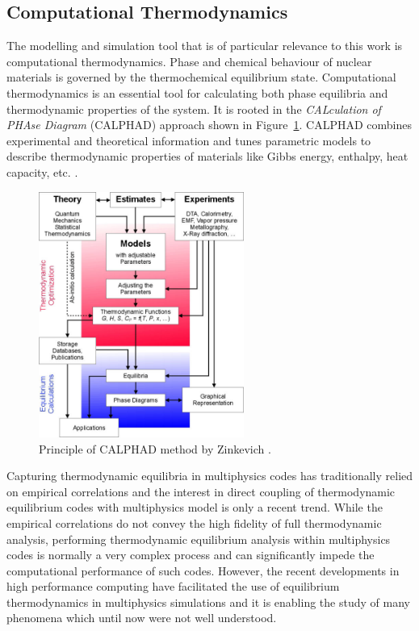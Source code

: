 \subsection{Computational Thermodynamics}
    The modelling and simulation tool that is of particular relevance to this work is computational thermodynamics. Phase and chemical behaviour of nuclear materials is governed by the thermochemical equilibrium state. Computational thermodynamics is an essential tool for calculating both phase equilibria and thermodynamic properties of the system. It is rooted in the \emph{CALculation of PHAse Diagram} (CALPHAD) approach shown in Figure~\ref{fig:calphad}. CALPHAD combines experimental and theoretical information and tunes parametric models to describe thermodynamic properties of materials like Gibbs energy, enthalpy, heat capacity, etc. \cite{Lukas07}.
	\begin{figure}[htb]
		\centering
		\includegraphics[width=0.6\textwidth]{figures/chapter-1/Calphad_method}
		\caption[Principle of CALPHAD method]{Principle of CALPHAD method by Zinkevich \cite{Zinkevich:2003aa}.}
		\label{fig:calphad}
	\end{figure}

	Capturing thermodynamic equilibria in multiphysics codes has traditionally relied on empirical correlations and the interest in direct coupling of thermodynamic equilibrium codes with multiphysics model is only a recent trend. While the empirical correlations do not convey the high fidelity of full thermodynamic analysis, performing thermodynamic equilibrium analysis within multiphysics codes is normally a very complex process and can significantly impede the computational performance of such codes. However, the recent developments in high performance computing have facilitated the use of equilibrium thermodynamics in multiphysics  simulations and it is enabling the study of many phenomena which until now were not well understood.
	

